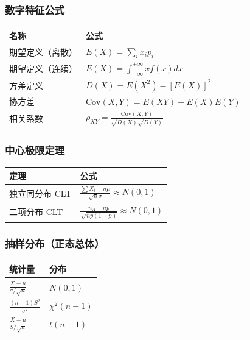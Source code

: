\documentclass[12pt,a4paper]{ctexart}
\begin{document}
\subsubsection{数字特征公式}
\begin{center}
    \begin{tabular}{@{}ll@{}}
        \toprule
        \textbf{名称} & \textbf{公式}                                                   \\ \midrule
        期望定义（离散）    & $E(X) = \sum_i x_i p_i$                                       \\
        期望定义（连续）    & $E(X) = \int_{-\infty}^{+\infty} x f(x) dx$                   \\
        方差定义        & $D(X) = E(X^2) - [E(X)]^2$                                    \\
        协方差         & $\text{Cov}(X, Y) = E(XY) - E(X)E(Y)$                         \\
        相关系数        & $\rho_{XY} = \frac{\text{Cov}(X, Y)}{\sqrt{D(X)}\sqrt{D(Y)}}$ \\ \bottomrule
    \end{tabular}
\end{center}

\subsubsection{中心极限定理}
\begin{center}
    \begin{tabular}{@{}ll@{}}
        \toprule
        \textbf{定理} & \textbf{公式}                                             \\ \midrule
        独立同分布 CLT   & $\frac{\sum X_i - n\mu}{\sqrt{n}\sigma} \approx N(0,1)$ \\
        二项分布 CLT    & $\frac{n_A - np}{\sqrt{np(1-p)}} \approx N(0,1)$        \\ \bottomrule
    \end{tabular}
\end{center}

\subsubsection{抽样分布（正态总体）}
\begin{center}
    \begin{tabular}{@{}ll@{}}
        \toprule
        \textbf{统计量}                            & \textbf{分布}   \\ \midrule
        $\frac{\bar{X} - \mu}{\sigma/\sqrt{n}}$ & $N(0, 1)$     \\
        $\frac{(n-1)S^2}{\sigma^2}$             & $\chi^2(n-1)$ \\
        $\frac{\bar{X} - \mu}{S/\sqrt{n}}$      & $t(n-1)$      \\ \bottomrule
    \end{tabular}
\end{center}
\end{document}

